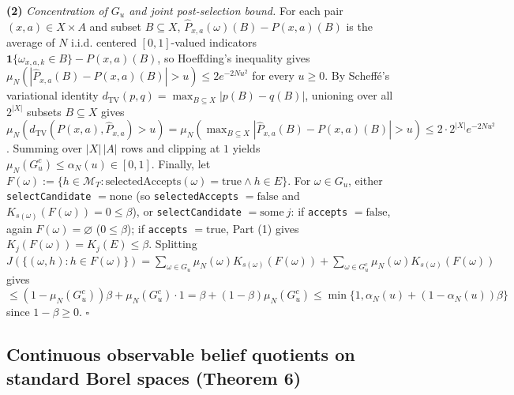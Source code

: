 \documentclass[11pt,a4paper]{article}
\newcounter{none}
\begin{document}
\textbf{(2)} \emph{Concentration of \(G_u\) and joint post-selection
bound.} For each pair \((x,a) \in X \times A\) and subset
\(B \subseteq X\), \(\widehat{P}_{x,a}(\omega)(B) - P(x,a)(B)\) is the
average of \(N\) i.i.d. centered \([0,1]\)-valued indicators
\(\mathbf{1}\{\omega_{x,a,k} \in B\} - P(x,a)(B)\), so Hoeffding's
inequality \citep{hoeffding1963} gives
\(\mu_N(|\widehat{P}_{x,a}(B) - P(x,a)(B)| > u) \le 2 e^{-2Nu^2}\) for
every \(u \ge 0\). By Scheffé's variational identity
\(d_{\mathrm{TV}}(p, q) = \max_{B \subseteq X} |p(B) - q(B)|\), unioning
over all \(2^{|X|}\) subsets \(B \subseteq X\) gives
\(\mu_N(d_{\mathrm{TV}}(P(x,a), \widehat{P}_{x,a}) > u) = \mu_N(\max_{B \subseteq X} |\widehat{P}_{x,a}(B) - P(x,a)(B)| > u) \le 2 \cdot 2^{|X|} e^{-2Nu^2}\).
Summing over \(|X|\,|A|\) rows and clipping at \(1\) yields
\(\mu_N(G_u^c) \le \alpha_N(u) \in [0,1]\). Finally, let
\(F(\omega) := \{h \in \mathcal{M}_T : \mathrm{selectedAccepts}(\omega) = \mathrm{true} \land h \in E\}\).
For \(\omega \in G_u\), either \texttt{selectCandidate}
\(= \mathrm{none}\) (so \texttt{selectedAccepts} \(= \mathrm{false}\)
and \(K_{s(\omega)}(F(\omega)) = 0 \le \beta\)), or
\texttt{selectCandidate} \(= \mathrm{some}\ j\): if \texttt{accepts}
\(= \mathrm{false}\), again \(F(\omega) = \varnothing\)
(\(0 \le \beta\)); if \texttt{accepts} \(= \mathrm{true}\), Part (1)
gives \(K_j(F(\omega)) = K_j(E) \le \beta\). Splitting
\(J(\{(\omega, h) : h \in F(\omega)\}) = \sum_{\omega \in G_u} \mu_N(\omega) K_{s(\omega)}(F(\omega)) + \sum_{\omega \in G_u^c} \mu_N(\omega) K_{s(\omega)}(F(\omega))\)
gives
\(\le (1 - \mu_N(G_u^c))\beta + \mu_N(G_u^c) \cdot 1 = \beta + (1 - \beta)\mu_N(G_u^c) \le \min\{1, \alpha_N(u) + (1 - \alpha_N(u))\beta\}\)
since \(1 - \beta \ge 0\). \(\square\)

\subsection{Continuous observable belief quotients on standard Borel
spaces (Theorem
6)}\label{continuous-observable-belief-quotients-on-standard-borel-spaces-theorem-6}
\end{document}
